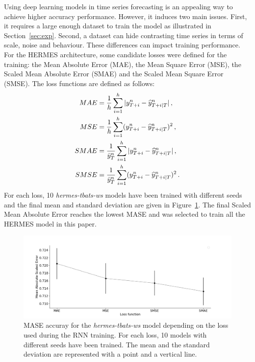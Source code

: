 \documentclass[review]{elsarticle}
\newcommand{\ts}{y}
\newcommand{\tspred}{\widehat{\ts}}
\newcommand{\lag}{h}
\newcommand{\meants}{\Bar{\ts}}
\begin{document}
Using deep learning models in time series forecasting is an appealing way to achieve higher accuracy performance. However, it induces two main issues. First, it requires a large enough dataset to train the model as illustrated in Section~\ref{sec:exp}. Second, a dataset can hide contrasting time series in terms of scale, noise and behaviour. These differences can impact training performance. For the HERMES architecture, some candidate losses were defined for the training: the Mean Absolute Error (MAE), the Mean Square Error (MSE),  the Scaled Mean Absolute Error (SMAE) and the Scaled Mean Square Error (SMSE). The loss functions are defined as follows:
\begin{align*}
MAE &= \frac{1}{\lag}\sum_{i=1}^{\lag}|\ts^n_{T+i} - \tspred^n_{T+i|T}|\,,\\
MSE &= \frac{1}{\lag}\sum_{i=1}^{\lag}(\ts^n_{T+i} - \tspred^n_{T+i|T})^2\,,\\
SMAE &= \frac{1}{\meants^n_T}\sum_{i=1}^{\lag}|\ts^n_{T+i} - \tspred^n_{T+i|T}|\,,\\
SMSE &= \frac{1}{\meants^n_T}\sum_{i=1}^{\lag}(\ts^n_{T+i} - \tspred^n_{T+i|T})^2\,.
\end{align*}
For each loss, 10 \textit{hermes-tbats-ws} models have been trained with different seeds and the final mean and standard deviation are given in Figure~\ref{fig:loss_function}. The final Scaled Mean Absolute Error reaches the lowest MASE and was selected to train all the HERMES model in this paper.

\begin{figure}
  \centering
    \includegraphics[width=1.\linewidth]{figure/loss_function}
  \caption{MASE accuray for the \textit{hermes-tbats-ws} model depending on the loss used during the RNN training. For each loss, 10 models with different seeds have been trained. The mean and the standard deviation are represented with a point and a vertical line.}
\label{fig:loss_function}
\end{figure}
\end{document}
